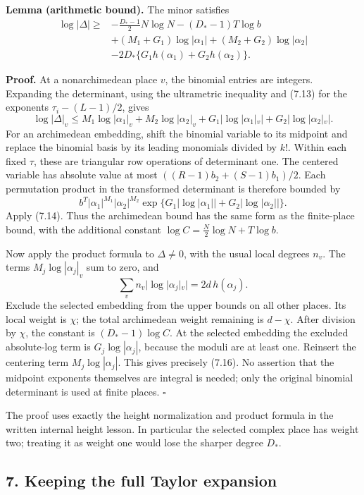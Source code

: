 \documentclass[
  11pt,
  a4paper,
]{article}
\begin{document}
\textbf{Lemma (arithmetic bound).} The minor satisfies \[
\begin{aligned}
\log|\Delta|\ge{}&
-\frac{D_*-1}{2}N\log N-(D_*-1)T\log b\\
&+(M_1+G_1)\log|\alpha_1|+(M_2+G_2)\log|\alpha_2|\\
&-2D_*\{G_1h(\alpha_1)+G_2h(\alpha_2)\}.
\end{aligned} \tag{7.16}
\]

\textbf{Proof.} At a nonarchimedean place \(v\), the binomial entries
are integers. Expanding the determinant, using the ultrametric
inequality and (7.13) for the exponents \(\tau_i-(L-1)/2\), gives \[
\log|\Delta|_v
\le M_1\log|\alpha_1|_v+M_2\log|\alpha_2|_v
+G_1|\log|\alpha_1|_v|+G_2|\log|\alpha_2|_v|.
\] For an archimedean embedding, shift the binomial variable to its
midpoint and replace the binomial basis by its leading monomials divided
by \(k!\). Within each fixed \(\tau\), these are triangular row
operations of determinant one. The centered variable has absolute value
at most \(((R-1)b_2+(S-1)b_1)/2\). Each permutation product in the
transformed determinant is therefore bounded by \[
b^T|\alpha_1|^{M_1}|\alpha_2|^{M_2}
\exp\{G_1|\log|\alpha_1||+G_2|\log|\alpha_2||\}.
\] Apply (7.14). Thus the archimedean bound has the same form as the
finite-place bound, with the additional constant
\(\log C=\tfrac N2\log N+T\log b\).

Now apply the product formula to \(\Delta\ne0\), with the usual local
degrees \(n_v\). The terms \(M_j\log|\alpha_j|_v\) sum to zero, and \[
\sum_v n_v|\log|\alpha_j|_v|=2d\,h(\alpha_j).
\] Exclude the selected embedding from the upper bounds on all other
places. Its local weight is \(\chi\); the total archimedean weight
remaining is \(d-\chi\). After division by \(\chi\), the constant is
\((D_*-1)\log C\). At the selected embedding the excluded absolute-log
term is \(G_j\log|\alpha_j|\), because the moduli are at least one.
Reinsert the centering term \(M_j\log|\alpha_j|\). This gives precisely
(7.16). No assertion that the midpoint exponents themselves are integral
is needed; only the original binomial determinant is used at finite
places. \(\square\)

The proof uses exactly the height normalization and product formula in
the written internal height lesson. In particular the selected complex
place has weight two; treating it as weight one would lose the sharper
degree \(D_*\).

\subsection{7. Keeping the full Taylor
expansion}\label{keeping-the-full-taylor-expansion}
\end{document}

